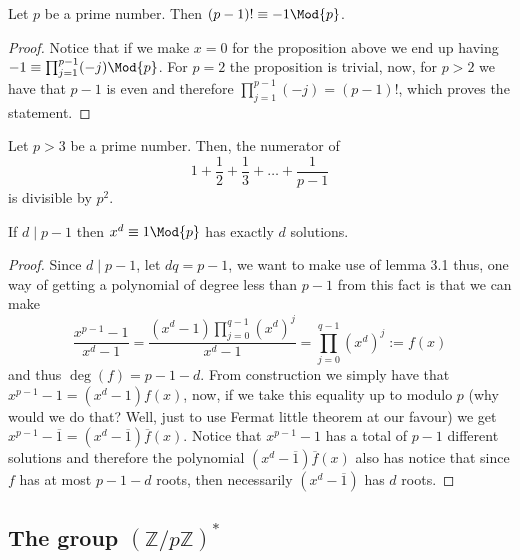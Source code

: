 \begin{corollary}
   Let \(p\) be a prime number. Then \((p-1)! \equiv -1 \Mod{p}\).
\end{corollary}

\begin{proof}
   Notice that if we make \(x = 0\) for the proposition above we end up having
   \(-1 \equiv \prod_{j=1}^{p-1}(-j) \Mod{p}\). For \(p = 2\) the proposition is
   trivial, now, for \(p > 2\) we have that \(p-1\) is even and therefore
   \(\prod_{j=1}^{p-1}(-j) = (p-1)!\), which proves the statement.
\end{proof}

\begin{proposition}
   Let \(p > 3\) be a prime number. Then, the numerator of  
   \[
      1 + \frac{1}{2} + \frac{1}{3} + \dots + \frac{1}{p-1}
   \] 
   is divisible by \(p^2\).
\end{proposition}


\begin{proposition}
   If \(d \mid p-1\) then \(x^d \equiv 1 \Mod{p}\) has exactly \(d\) solutions.
\end{proposition}

\begin{proof}
   Since \(d \mid p-1\), let \(dq = p-1\), we want to make use of lemma 3.1
   thus, one way of getting a polynomial of degree less than \(p-1\) from this
   fact is that we can make
   \[
      \frac{x^{p-1} - 1}{x^d - 1} = \frac{(x^d - 1) \prod_{j=0}^{q-1}
      (x^d)^j}{x^d - 1} = \prod_{j=0}^{q-1} (x^d)^{j} := f(x)
   \] 
   and thus \(\deg(f) = p-1-d\). From construction we simply have that \(x^{p-1}
   - 1 = (x^d - 1)f(x)\), now, if we take this equality up to modulo \(p\) (why
   would we do that? Well, just to use Fermat little theorem at our favour) we
   get \(x^{p-1} - \overline{1} = (x^d - \overline{1}) \overline{f}(x)\). Notice
   that \(x^{p-1} - 1\) has a total of \(p-1\) different solutions and therefore
   the polynomial \((x^d - \overline{1}) \overline{f}(x)\) also has notice that
   since \(f\) has at most \(p-1-d\) roots, then necessarily \((x^d -
   \overline{1})\) has \(d\) roots. 
\end{proof}

\subsection{The group \texorpdfstring{\((\mathbb{Z}/p\mathbb{Z})^\ast\)}{(Z/pZ)*}}

